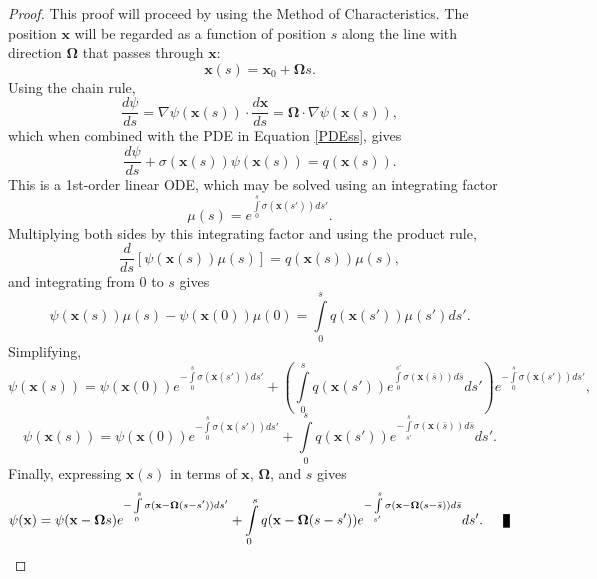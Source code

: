 \begin{proof}
   This proof will proceed by using the Method of Characteristics. The position
   $\mathbf{x}$ will be regarded as a function of position $s$ along the line
   with direction $\mathbf{\Omega}$ that passes through $\mathbf{x}$:
   \[
      \mathbf{x}(s) = \mathbf{x}_0 + \mathbf{\Omega}s.
   \]
   Using the chain rule,
   \[
      \frac{d\psi}{ds} = \nabla\psi(\mathbf{x}(s)) \cdot \frac{d\mathbf{x}}{ds}
         = \mathbf{\Omega} \cdot \nabla\psi(\mathbf{x}(s)),
   \]
   which when combined with the PDE in Equation \eqref{PDEss}, gives
   \[
      \frac{d\psi}{ds} + \sigma(\mathbf{x}(s))\psi(\mathbf{x}(s)) = q(\mathbf{x}(s)).
   \]
   This is a 1st-order linear ODE, which may be solved using an integrating factor
   \[
      \mu(s)=e^{\int\limits_0^s\sigma(\mathbf{x}(s'))ds'}.
   \]
   Multiplying both sides by this integrating factor and using the product rule,
   \[
      \frac{d}{ds}\left[\psi(\mathbf{x}(s))\mu(s)\right] = q(\mathbf{x}(s)) \mu(s),
   \]
   and integrating from $0$ to $s$ gives
   \[
      \psi(\mathbf{x}(s))\mu(s)-\psi(\mathbf{x}(0))\mu(0) =
         \int\limits_0^s q(\mathbf{x}(s')) \mu(s') ds'.
   \]
   Simplifying,
   \[
      \psi(\mathbf{x}(s)) = \psi(\mathbf{x}(0))
         e^{-\int\limits_0^s \sigma(\mathbf{x}(s'))ds'} +
         \left(\int\limits_0^s q(\mathbf{x}(s'))
         e^{\int\limits_0^{s'}\sigma(\mathbf{x}(\bar{s}))d\bar{s}} ds'\right)
         e^{-\int\limits_0^s\sigma(\mathbf{x}(s'))ds'},
   \]
   \[
      \psi(\mathbf{x}(s)) = \psi(\mathbf{x}(0))
         e^{-\int\limits_0^s \sigma(\mathbf{x}(s'))ds'} +
         \int\limits_0^s q(\mathbf{x}(s'))
         e^{-\int\limits_{s'}^s\sigma(\mathbf{x}(\bar{s}))d\bar{s}} ds'.
   \]
   Finally, expressing $\mathbf{x}(s)$ in terms of $\mathbf{x}$, $\mathbf{\Omega}$,
   and $s$ gives
   \[
      \psi(\mathbf{x}) = \psi(\mathbf{x} - \mathbf{\Omega}s)
         e^{-\int\limits_0^s \sigma(\mathbf{x} - \mathbf{\Omega}(s -s'))ds'} +
         \int\limits_0^s q(\mathbf{x} - \mathbf{\Omega}(s -s'))
         e^{-\int\limits_{s'}^s\sigma(\mathbf{x}
         - \mathbf{\Omega}(s -\bar{s}))d\bar{s}} ds'.\qed
   \]
\end{proof}
